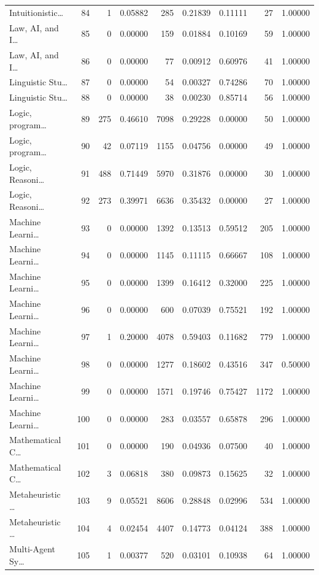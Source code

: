 \begin{table}
\begin{tabular}{lrrrrrrrr}
Intuitionistic… & 84 & 1 & 0.05882 & 285 & 0.21839 & 0.11111 & 27 & 1.00000 \\
Law, AI, and I… & 85 & 0 & 0.00000 & 159 & 0.01884 & 0.10169 & 59 & 1.00000 \\
Law, AI, and I… & 86 & 0 & 0.00000 & 77 & 0.00912 & 0.60976 & 41 & 1.00000 \\
Linguistic Stu… & 87 & 0 & 0.00000 & 54 & 0.00327 & 0.74286 & 70 & 1.00000 \\
Linguistic Stu… & 88 & 0 & 0.00000 & 38 & 0.00230 & 0.85714 & 56 & 1.00000 \\
Logic, program… & 89 & 275 & 0.46610 & 7098 & 0.29228 & 0.00000 & 50 & 1.00000 \\
Logic, program… & 90 & 42 & 0.07119 & 1155 & 0.04756 & 0.00000 & 49 & 1.00000 \\
Logic, Reasoni… & 91 & 488 & 0.71449 & 5970 & 0.31876 & 0.00000 & 30 & 1.00000 \\
Logic, Reasoni… & 92 & 273 & 0.39971 & 6636 & 0.35432 & 0.00000 & 27 & 1.00000 \\
Machine Learni… & 93 & 0 & 0.00000 & 1392 & 0.13513 & 0.59512 & 205 & 1.00000 \\
Machine Learni… & 94 & 0 & 0.00000 & 1145 & 0.11115 & 0.66667 & 108 & 1.00000 \\
Machine Learni… & 95 & 0 & 0.00000 & 1399 & 0.16412 & 0.32000 & 225 & 1.00000 \\
Machine Learni… & 96 & 0 & 0.00000 & 600 & 0.07039 & 0.75521 & 192 & 1.00000 \\
Machine Learni… & 97 & 1 & 0.20000 & 4078 & 0.59403 & 0.11682 & 779 & 1.00000 \\
Machine Learni… & 98 & 0 & 0.00000 & 1277 & 0.18602 & 0.43516 & 347 & 0.50000 \\
Machine Learni… & 99 & 0 & 0.00000 & 1571 & 0.19746 & 0.75427 & 1172 & 1.00000 \\
Machine Learni… & 100 & 0 & 0.00000 & 283 & 0.03557 & 0.65878 & 296 & 1.00000 \\
Mathematical C… & 101 & 0 & 0.00000 & 190 & 0.04936 & 0.07500 & 40 & 1.00000 \\
Mathematical C… & 102 & 3 & 0.06818 & 380 & 0.09873 & 0.15625 & 32 & 1.00000 \\
Metaheuristic … & 103 & 9 & 0.05521 & 8606 & 0.28848 & 0.02996 & 534 & 1.00000 \\
Metaheuristic … & 104 & 4 & 0.02454 & 4407 & 0.14773 & 0.04124 & 388 & 1.00000 \\
Multi-Agent Sy… & 105 & 1 & 0.00377 & 520 & 0.03101 & 0.10938 & 64 & 1.00000 \\

\end{tabular}
\end{table}
